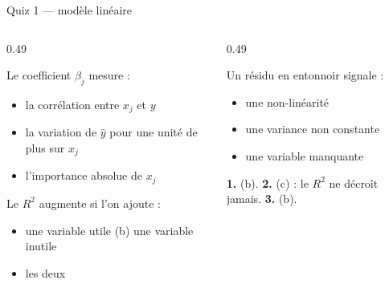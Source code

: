\begin{frame}{Quiz 1 --- modèle linéaire}
\begin{columns}[t]
\begin{column}{0.49\textwidth}
\begin{qbox}[Question 1]
Le coefficient $\beta_j$ mesure :
\begin{itemize}
  \item[(a)] la corrélation entre $x_j$ et $y$
  \item[(b)] la variation de $\hat y$ pour une unité de plus sur $x_j$
  \item[(c)] l'importance absolue de $x_j$
\end{itemize}
\end{qbox}
\begin{qbox}[Question 2]
Le $R^2$ augmente si l'on ajoute :
\begin{itemize}
  \item[(a)] une variable utile \quad (b) une variable inutile
  \item[(c)] les deux
\end{itemize}
\end{qbox}
\end{column}
\begin{column}{0.49\textwidth}
\begin{qbox}[Question 3]
Un résidu en entonnoir signale :
\begin{itemize}
  \item[(a)] une non-linéarité
  \item[(b)] une variance non constante
  \item[(c)] une variable manquante
\end{itemize}
\end{qbox}
\begin{solbox}[Réponses]
\textbf{1.} (b). \quad \textbf{2.} (c) : le $R^2$ ne décroît jamais.
\quad \textbf{3.} (b).
\end{solbox}
\end{column}
\end{columns}
\end{frame}
